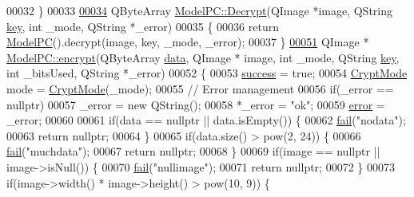 \begin{DoxyCode}
00032 \}
00033 
\hypertarget{modelpc_8cpp_source.tex_l00034}{}\hyperlink{class_model_p_c_a902abaea4f07995b48c0f2fea6eceb7c}{00034} QByteArray \hyperlink{class_model_p_c_a902abaea4f07995b48c0f2fea6eceb7c}{ModelPC::Decrypt}(QImage *image, QString \hyperlink{namespace_errors_dict_setup_a09c268098d09ffb8e5504f30fa6d5dd9}{key}, \textcolor{keywordtype}{int} \_mode, QString *\_error)
00035 \{
00036     \textcolor{keywordflow}{return} \hyperlink{class_model_p_c_ae12ebe65ec973c02a0de4850a7c1e31c}{ModelPC}().decrypt(image, key, \_mode, \_error);
00037 \}
\hypertarget{modelpc_8cpp_source.tex_l00051}{}\hyperlink{class_model_p_c_a6f191f62d4635d0d3555fcc0be298794}{00051} QImage * \hyperlink{class_model_p_c_a6f191f62d4635d0d3555fcc0be298794}{ModelPC::encrypt}(QByteArray \hyperlink{namespace_errors_dict_setup_af570460846fb9f0c91abd308a095dcdc}{data}, QImage * image, \textcolor{keywordtype}{int} \_mode, QString 
      \hyperlink{namespace_errors_dict_setup_a09c268098d09ffb8e5504f30fa6d5dd9}{key}, \textcolor{keywordtype}{int} \_bitsUsed, QString *\_error)
00052 \{
00053     \hyperlink{class_model_p_c_a945ffbbc44a832b953c191debd448f4c}{success} = \textcolor{keyword}{true};
00054     \hyperlink{class_model_p_c_a296dd7afe3e1c49b3da25fd644fe4ceb}{CryptMode} mode = \hyperlink{class_model_p_c_a296dd7afe3e1c49b3da25fd644fe4ceb}{CryptMode}(\_mode);
00055     \textcolor{comment}{// Error management}
00056     \textcolor{keywordflow}{if}(\_error == \textcolor{keyword}{nullptr})
00057         \_error = \textcolor{keyword}{new} QString();
00058     *\_error = \textcolor{stringliteral}{"ok"};
00059     \hyperlink{class_model_p_c_a4e5a9c0ca1f06fe5bc478b6bf248c37c}{error} = \_error;
00060 
00061     \textcolor{keywordflow}{if}(data == \textcolor{keyword}{nullptr} || data.isEmpty()) \{
00062         \hyperlink{class_model_p_c_a47464b59b7e37fcee25e55475708aabd}{fail}(\textcolor{stringliteral}{"nodata"});
00063         \textcolor{keywordflow}{return} \textcolor{keyword}{nullptr};
00064     \}
00065     \textcolor{keywordflow}{if}(data.size() > pow(2, 24)) \{
00066         \hyperlink{class_model_p_c_a47464b59b7e37fcee25e55475708aabd}{fail}(\textcolor{stringliteral}{"muchdata"});
00067         \textcolor{keywordflow}{return} \textcolor{keyword}{nullptr};
00068     \}
00069     \textcolor{keywordflow}{if}(image == \textcolor{keyword}{nullptr} || image->isNull()) \{
00070         \hyperlink{class_model_p_c_a47464b59b7e37fcee25e55475708aabd}{fail}(\textcolor{stringliteral}{"nullimage"});
00071         \textcolor{keywordflow}{return} \textcolor{keyword}{nullptr};
00072     \}
00073     \textcolor{keywordflow}{if}(image->width() * image->height() > pow(10, 9)) \{

\end{DoxyCode}
